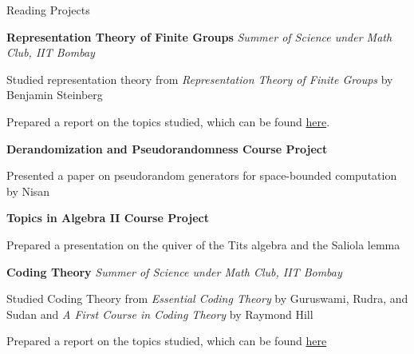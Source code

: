 
\begin{rubric}{Reading Projects}

	\entry*[2022] \textbf{Representation Theory of Finite Groups} \hfill \emph{Summer of Science under Math Club, IIT Bombay}

		Studied representation theory from \emph{Representation Theory of Finite Groups} by Benjamin Steinberg

		Prepared a report on the topics studied, which can be found \href{https://amitrajaraman.github.io/notes/rep-th/main.pdf}{here}.

	\entry*[2022\phantom{}] \textbf{Derandomization and Pseudorandomness Course Project}

		Presented a paper on pseudorandom generators for space-bounded computation by Nisan

	\entry*[2020\phantom{}] \textbf{Topics in Algebra II Course Project}

		Prepared a presentation on the quiver of the Tits algebra and the Saliola lemma

	\entry*[2020] \textbf{Coding Theory} \hfill \emph{Summer of Science under Math Club, IIT Bombay}

		Studied Coding Theory from \textit{Essential Coding Theory} by Guruswami, Rudra, and Sudan and \textit{A First Course in Coding Theory} by Raymond Hill
		

		Prepared a report on the topics studied, which can be found \href{https://amitrajaraman.github.io/notes/coding-th/Coding_Theory.pdf}{here}





        
\end{rubric}